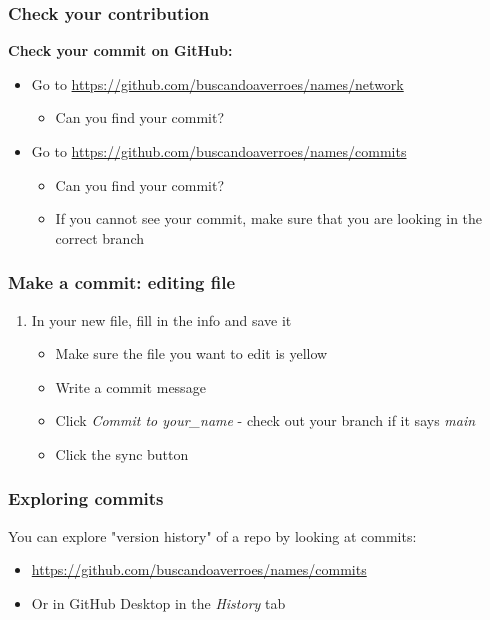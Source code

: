 \documentclass[aspectratio=169]{beamer} %
\newcommand{\trainingURL}[1]{{\color{blue}\url{#1}}}
\newcommand{\traininerUsername}{buscandoaverroes}
\newcommand{\repoName}{\traininerUsername/names}
\newcommand{\trainingRepoURL}[1]{\trainingURL{https://github.com/\repoName #1}}
\begin{document}
\begin{frame}
\frametitle{Check your contribution}

	\textbf{Check your commit on GitHub:}
	\begin{itemize}
		\item Go to \trainingRepoURL{/network}
		\begin{itemize}
			\item Can you find your commit?
		\end{itemize}
		\item Go to \trainingRepoURL{/commits}
		\begin{itemize}
			\item Can you find your commit?
			\item If you cannot see your commit, make sure that you are looking in the correct branch
		\end{itemize}
	\end{itemize}

\end{frame}



\begin{frame}
\frametitle{Make a commit: editing file}


	\begin{enumerate}
		\item In your new file, fill in the info and save it
		\begin{itemize}
			\item Make sure the file you want to edit is yellow
			\item Write a commit message
			\item Click \textit{Commit to your\_name} - check out your branch if it says \textit{main}
			\item Click the sync button
		\end{itemize}
	\end{enumerate}


\end{frame}


\begin{frame}
\frametitle{Exploring commits}

	You can explore "version history" of a repo by looking at commits:

	\vspace{.25cm}

	\begin{itemize}
		\item \trainingRepoURL{/commits}
		\item Or in GitHub Desktop in the \textit{History} tab
	\end{itemize}

\end{frame}
\end{document}
